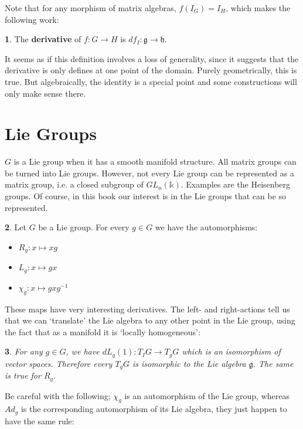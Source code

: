 \documentclass[oneside,english]{amsbook}
\numberwithin{section}{chapter}
\theoremstyle{plain}
\newtheorem{thm}{\protect\theoremname}
\theoremstyle{definition}
\newtheorem{defn}[thm]{\protect\definitionname}
\providecommand{\definitionname}{Definition}
\providecommand{\theoremname}{Theorem}
\begin{document}
Note that for any morphism of matrix algebras, $f(I_G) = I_H$, which makes the following work:

\begin{defn}
	The \textbf{derivative} of $f:G\to H$ is $df_I: \mathfrak{g}\to \mathfrak{h}$.
\end{defn}

It seems as if this definition involves a loss of generality, since it suggests that the derivative is only defines at one point of the domain. Purely geometrically, this is true. But algebraically, the identity is a special point and some constructions will only make sense there. 

\section{Lie Groups}

$G$ is a Lie group when it has a smooth manifold structure. All matrix groups can be turned into Lie groups. However, not every Lie group can be represented as a matrix group, i.e. a closed subgroup of $GL_n(\mathbb{k})$. Examples are the Heisenberg groups. Of course, in this book our interest is in the Lie groups that can be so represented.

\begin{defn}
	Let $G$ be a Lie group. For every $g\in G$ we have the automorphisms:
	\begin{itemize}
		\item $R_g:x\mapsto xg$
		\item $L_g:x\mapsto gx$
		\item $\chi_g:x\mapsto gxg^{-1}$
	\end{itemize}
\end{defn}

These maps have very interesting derivatives. The left- and right-actions tell us that we can `translate' the Lie algebra to any other point in the Lie group, using the fact that as a manifold it is `locally homogeneous':

\begin{thm}
	For any $g\in G$, we have $dL_g(1): T_I G\to T_g G$ which is an isomorphism of vector spaces. Therefore every $T_g G$ is isomorphic to the Lie algebra $\mathfrak{g}$. The same is true for $R_g$.
\end{thm}

Be careful with the following; $\chi_g$ is an automorphism of the Lie group, whereas $Ad_g$ is the corresponding automorphism of its Lie algebra, they just happen to have the same rule:
\end{document}
